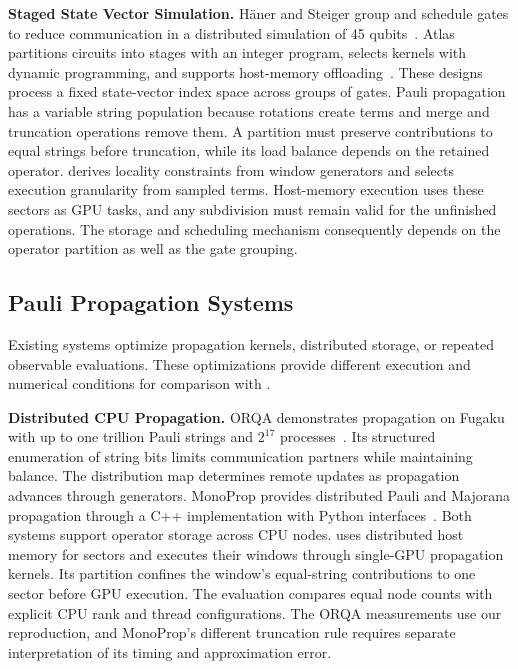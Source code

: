 \noindent\textbf{Staged State Vector Simulation.}
H\"aner and Steiger group and schedule gates to reduce communication in a distributed simulation of 45 qubits~\cite{haner2017petabyte}.
Atlas partitions circuits into stages with an integer program, selects kernels with dynamic programming, and supports host-memory offloading~\cite{xu2024atlas}.
These designs process a fixed state-vector index space across groups of gates.
Pauli propagation has a variable string population because rotations create terms and merge and truncation operations remove them.
A partition must preserve contributions to equal strings before truncation, while its load balance depends on the retained operator.
\SectorQ derives locality constraints from window generators and selects execution granularity from sampled terms.
Host-memory execution uses these sectors as GPU tasks, and any subdivision must remain valid for the unfinished operations.
The storage and scheduling mechanism consequently depends on the operator partition as well as the gate grouping.

\subsection{Pauli Propagation Systems}
Existing systems optimize propagation kernels, distributed storage, or repeated observable evaluations.
These optimizations provide different execution and numerical conditions for comparison with \SectorQ.

\noindent\textbf{Distributed CPU Propagation.}
ORQA demonstrates propagation on Fugaku with up to one trillion Pauli strings and $2^{17}$ processes~\cite{orqa}.
Its structured enumeration of string bits limits communication partners while maintaining balance.
The distribution map determines remote updates as propagation advances through generators.
MonoProp provides distributed Pauli and Majorana propagation through a C++ implementation with Python interfaces~\cite{monoprop}.
Both systems support operator storage across CPU nodes.
\SectorQ uses distributed host memory for sectors and executes their windows through single-GPU propagation kernels.
Its partition confines the window's equal-string contributions to one sector before GPU execution.
The evaluation compares equal node counts with explicit CPU rank and thread configurations.
The ORQA measurements use our reproduction, and MonoProp's different truncation rule requires separate interpretation of its timing and approximation error.

